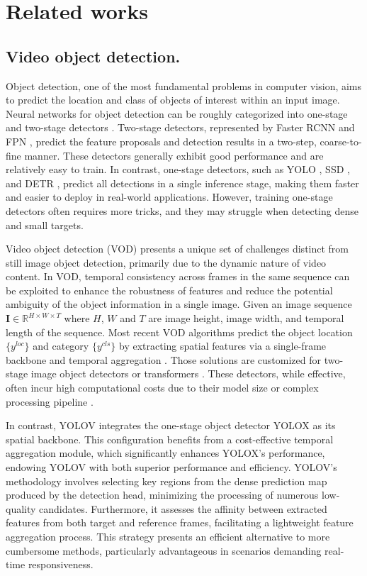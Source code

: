 \section{Related works}
\label{sec:related}

\subsection{Video object detection.} 
Object detection, one of the most fundamental problems in computer vision, aims to predict the location and class of objects of interest within an input image. Neural networks for object detection can be roughly categorized into one-stage and two-stage detectors \cite{zou2023object}. Two-stage detectors, represented by Faster RCNN \cite{faster_rcnn} and FPN \cite{lin2017feature}, predict the feature proposals and detection results in a two-step, coarse-to-fine manner. These detectors generally exhibit good performance and are relatively easy to train. In contrast, one-stage detectors, such as YOLO \cite{YOLOv1}, SSD \cite{liu2016ssd}, and DETR \cite{carion2020end}, predict all detections in a single inference stage, making them faster and easier to deploy in real-world applications. However, training one-stage detectors often requires more tricks, and they may struggle when detecting dense and small targets.

Video object detection (VOD) presents a unique set of challenges distinct from still image object detection, primarily due to the dynamic nature of video content. In VOD, temporal consistency across frames in the same sequence can be exploited to enhance the robustness of features and reduce the potential ambiguity of the object information in a single image. 
Given an image sequence $\mathbf{I}\in \mathbb{R}^{H\times W \times T}$ where $H$, $W$ and $T$ are image height, image width, and temporal length of the sequence. Most recent VOD algorithms predict the object location $\{y^{loc}\}$ and category $\{y^{cls}\}$ by extracting spatial features via a single-frame backbone and temporal aggregation \cite{wu2019sequence}.
Those solutions are customized for two-stage image object detectors \cite{faster_rcnn, gong2021temporal} or transformers \cite{wang2022ptseformer, VSformer, zhou2022transvod}. These detectors, while effective, often incur high computational costs due to their model size or complex processing pipeline \cite{li2021free}.

In contrast, YOLOV \cite{li2021free} integrates the one-stage object detector YOLOX \cite{ge2021yolox} as its spatial backbone. This configuration benefits from a cost-effective temporal aggregation module, which significantly enhances YOLOX's performance, endowing YOLOV with both superior performance and efficiency. YOLOV's methodology involves selecting key regions from the dense prediction map produced by the detection head, minimizing the processing of numerous low-quality candidates. Furthermore, it assesses the affinity between extracted features from both target and reference frames, facilitating a lightweight feature aggregation process. This strategy presents an efficient alternative to more cumbersome methods, particularly advantageous in scenarios demanding real-time responsiveness.

